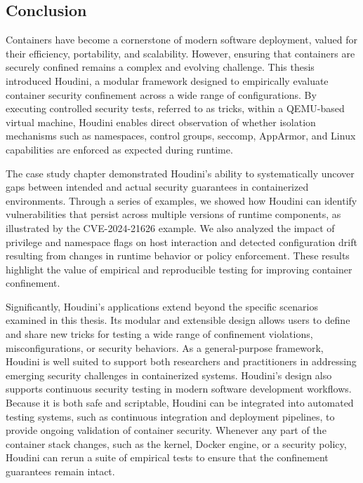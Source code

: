 \documentclass[12pt]{report}
\providecommand{\DIFaddbegin}{} %
\providecommand{\DIFaddend}{} %
\newcommand{\DIFaddincludegraphics}[2][]{{\color{blue}\fbox{\DIFOincludegraphics[#1]{#2}}}} %
\DeclareRobustCommand{\DIFaddbegin}{\DIFOaddbegin \let\includegraphics\DIFaddincludegraphics} %
\DeclareRobustCommand{\DIFaddend}{\DIFOaddend \let\includegraphics\DIFOincludegraphics} %
\begin{document}
\begin{doublespace}
\chapter{Conclusion}
\DIFaddbegin 

\DIFaddend Containers have become a cornerstone of modern software deployment, valued for their efficiency, portability, and scalability. However, ensuring that containers are securely confined remains a complex and evolving challenge. This thesis introduced Houdini, a modular framework designed to empirically evaluate container security confinement across a wide range of configurations. By executing controlled security tests, referred to as tricks, within a QEMU-based virtual machine, Houdini enables direct observation of whether isolation mechanisms such as namespaces, control groups, seccomp, AppArmor, and Linux capabilities are enforced as expected during runtime.

The case study chapter demonstrated Houdini's ability to systematically uncover gaps between intended and actual security guarantees in containerized environments. Through a series of examples, we showed how Houdini can identify vulnerabilities that persist across multiple versions of runtime components, as illustrated by the CVE-2024-21626 example. We also analyzed the impact of privilege and namespace flags on host interaction and detected configuration drift resulting from changes in runtime behavior or policy enforcement. These results highlight the value of empirical and reproducible testing for improving container confinement.

Significantly, Houdini’s applications extend beyond the specific scenarios examined in this thesis. Its modular and extensible design allows users to define and share new tricks for testing a wide range of confinement violations, misconfigurations, or security behaviors. As a general-purpose framework, Houdini is well suited to support both researchers and practitioners in addressing emerging security challenges in containerized systems.
Houdini’s design also supports continuous security testing in modern software development workflows. Because it is both safe and scriptable, Houdini can be integrated into automated testing systems, such as continuous integration and deployment pipelines, to provide ongoing validation of container security. Whenever any part of the container stack changes, such as the kernel, Docker engine, or a security policy, Houdini can rerun a suite of empirical tests to ensure that the confinement guarantees remain intact.


\end{doublespace}
\end{document}
